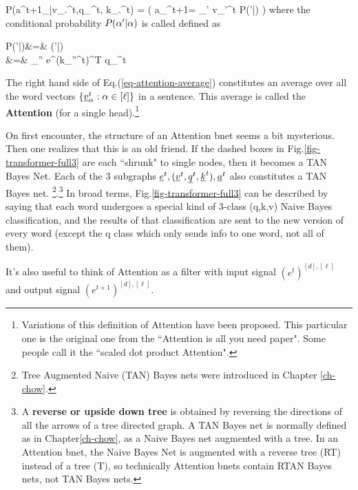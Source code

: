 \beq\color{blue}
P(a^{t+1}_\alp|v_.^t,q_\alp^t,
 k_.^t)
=
\indi(\;\;\;
a_\alp^{t+1}=
\sum_{{\alp'}\in[\ell]}
v_{\alp'}^t
P({\alp'}|\alp)
\;\;)
\label{eq-attention-average}
\eeq
where the conditional
probability 
$P({\alpha'}|\alpha)$ is 
called defined as

\beqa
P({\alp'}|\alp)&=&
\softmax{}(\alp'|\alp)
\\
&=&
{\sum_{\alp''\in [\ell]}
e^{(k_{\alp''}^t)^T q_\alp^t}}
\eeqa

The right hand side of Eq.(\ref{eq-attention-average})
constitutes an average over 
all the word vectors $\{{\underline{v}}_\alpha^t: \alpha\in[\ell]\}$
in a sentence.
This average is called the {\bf Attention}
(for a single head).\footnote{Variations
of this definition of Attention
have been proposed. This particular one
is the original
one from the ``Attention is all
you need paper". Some people
call it the ``scaled dot product Attention".}

\beq
{}
\eeq



On first encounter, the structure of an Attention bnet
seems a bit mysterious. Then one realizes that this is
an old friend. 
If the dashed  boxes in 
Fig.\ref{fig-transformer-full3} are each ``shrunk" to single nodes,
then it becomes a TAN Bayes Net. Each of the 3 subgraphs ${\underline{e}}^t, ({\underline{v}}^t, {\underline{q}}^t, {\underline{k}}^t), {\underline{a}}^t $
also constitutes a TAN Bayes net. \footnote{Tree Augmented Naive (TAN) Bayes nets
were introduced in Chapter \ref{ch-chow}.}.\footnote{A {\bf reverse or upside down tree} is obtained by reversing the directions of all the arrows of a tree directed graph. A TAN Bayes net is normally defined as in Chapter\ref{ch-chow}, as a Naive Bayes net augmented with a tree. In an Attention bnet, the Naive Bayes Net is augmented with a reverse tree (RT) instead of a tree (T), so technically Attention bnets contain RTAN Bayes nets, not TAN Bayes nets. }
In broad terms, Fig.\ref{fig-transformer-full3}
can be described by saying that
each word undergoes a special
kind of 3-class (q,k,v) Naive Bayes
classification,
and the results of that classification
are sent to the new version of every word (except the q class which only sends
info to one word, not all of them).

It's also useful to think of Attention
as a filter with input signal $(e^t)^{[d], [\ell]}$ and output signal
$(e^{t+1})^{[d], [\ell]}$.

